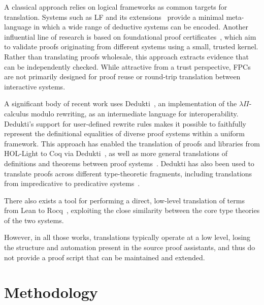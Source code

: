 \documentclass{article}
\theoremstyle{plain}
\theoremstyle{definition}
\theoremstyle{remark}
\begin{document}
        A classical approach relies on logical frameworks as common
        targets for translation. Systems such as LF and its
        extensions~\cite{harper1993framework} provide a
        minimal meta-language in which a wide range of deductive
        systems can be encoded. 
        Another influential line of research is based on foundational
        proof certificates~\cite{chihani:hal-00906485}, which aim to
        validate proofs originating from different systems using a
        small, trusted kernel. Rather than translating proofs
        wholesale, this approach extracts evidence that can be
        independently checked. While attractive from a trust
        perspective, FPCs are not primarily designed for proof reuse
        or round-trip translation between interactive systems.

        A significant body of recent work uses Dedukti~\cite{Dedukti}, an
        implementation of the $\lambda\Pi$-calculus modulo rewriting,
        as an intermediate language for interoperability. Dedukti’s
        support for user-defined rewrite rules makes it possible to
        faithfully represent the definitional equalities of diverse
        proof systems within a uniform framework. This approach has
        enabled the translation of proofs and libraries from HOL-Light
        to Coq via Dedukti~\cite{Blanqui2024TranslatingHOLLight}, as
        well as more general translations of definitions and theorems
        between proof
        systems~\cite{FrédéricBlanqui2024Libraries}. Dedukti has also
        been used to translate proofs across different type-theoretic
        fragments, including translations from impredicative to
        predicative systems~\cite{FelicissimoBlanquiBarnawal2023}.

        There also exists a tool for performing a direct, low-level
        translation of terms from Lean to
        Rocq~\cite{leantypechecker}, exploiting the close similarity
        between the core type theories of the two systems.
        
        However, in all those works, translations typically operate at
        a low level, losing the structure and automation present
        in the source proof assistants, and thus do not provide a
        proof script that can be maintained and extended.
        

        
	\section{Methodology}
	
\end{document}
